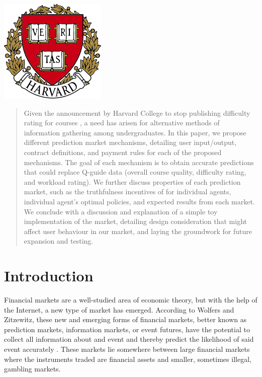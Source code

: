 \begin{titlepage}

\includegraphics{logo.png}\\[1cm] %
 

\vfill %

\end{titlepage}

\begin{abstract}
Given the announcement by Harvard College to stop publishing difficulty rating for courses \cite{crimson}, a need has arisen for alternative methods of information gathering among undergraduates. In this paper, we propose different prediction market mechanisms, detailing user input/output, contract definitions, and payment rules for each of the proposed mechanisms. The goal of each mechanism is to obtain accurate predictions that could replace Q-guide data (overall course quality, difficulty rating, and workload rating). We further discuss properties of each prediction market, such as the truthfulness incentives of for individual agents, individual agent's optimal policies, and expected results from each market. We conclude with a discussion and explanation of a simple toy implementation of the market, detailing design consideration that might affect user behaviour in our market, and laying the groundwork for future expansion and testing. 
\end{abstract}

\newpage
\tableofcontents
\listoffigures
\newpage
{}

\section{Introduction}
Financial markets are a well-studied area of economic theory, but with the help of the Internet, a new type of market has emerged. According to Wolfers and Zitzewitz, these new and emerging forms of financial markets, better known as prediction markets, information markets, or event futures, have the potential to collect all information about and event and thereby predict the likelihood of said event accurately \cite{wolfers}. These markets lie somewhere between large financial markets where the instruments traded are financial assets and smaller, sometimes illegal, gambling markets.  

